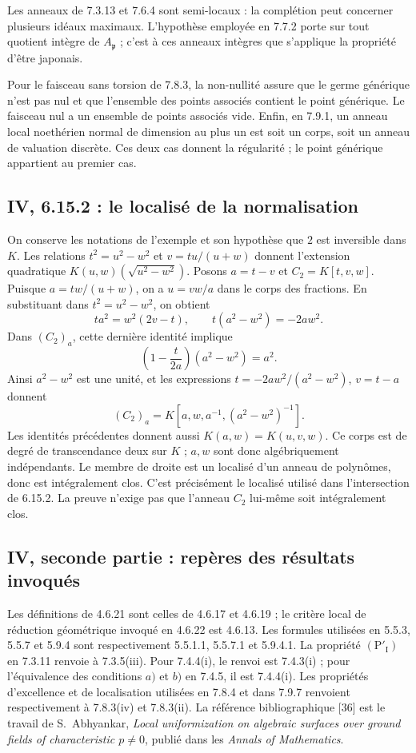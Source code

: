 \documentclass[11pt,a4paper]{article}
\begin{document}
Les anneaux de 7.3.13 et 7.6.4 sont semi-locaux : la complétion peut
concerner plusieurs idéaux maximaux. L'hypothèse employée en 7.7.2 porte
sur tout quotient intègre de $A_{\mathfrak p}$ ; c'est à ces anneaux
intègres que s'applique la propriété d'être japonais.

Pour le faisceau sans torsion de 7.8.3, la non-nullité assure que le
germe générique n'est pas nul et que l'ensemble des points associés
contient le point générique. Le faisceau nul a un ensemble de points
associés vide. Enfin, en 7.9.1, un anneau local noethérien normal de
dimension au plus un est soit un corps, soit un anneau de valuation
discrète. Ces deux cas donnent la régularité ; le point générique
appartient au premier cas.

\subsection{IV, 6.15.2 : le localisé de la normalisation}
\label{note:iv2-normalization}
On conserve les notations de l'exemple et son hypothèse que $2$ est
inversible dans $K$. Les relations $t^2=u^2-w^2$ et $v=tu/(u+w)$
donnent l'extension quadratique $K(u,w)(\sqrt{u^2-w^2})$.
Posons $a=t-v$ et $C_2=K[t,v,w]$. Puisque $a=tw/(u+w)$,
on a $u=vw/a$ dans le corps des fractions. En substituant dans
$t^2=u^2-w^2$, on obtient
\[
 t a^2=w^2(2v-t),\qquad t(a^2-w^2)=-2aw^2.
\]
Dans $(C_2)_a$, cette dernière identité implique
\[
 \left(1-\frac{t}{2a}\right)(a^2-w^2)=a^2.
\]
Ainsi $a^2-w^2$ est une unité, et les expressions
$t=-2aw^2/(a^2-w^2)$, $v=t-a$ donnent
\[
 (C_2)_a=K[a,w,a^{-1},(a^2-w^2)^{-1}].
\]
Les identités précédentes donnent aussi $K(a,w)=K(u,v,w)$.
Ce corps est de degré de transcendance deux sur $K$ ; $a,w$ sont donc
algébriquement indépendants. Le membre de droite est un localisé d'un
anneau de polynômes, donc est intégralement clos. C'est précisément le
localisé utilisé dans l'intersection de 6.15.2. La preuve n'exige pas
que l'anneau $C_2$ lui-même soit intégralement clos.

\subsection{IV, seconde partie : repères des résultats invoqués}
\label{note:iv2-refs}
Les définitions de 4.6.21 sont celles de 4.6.17 et 4.6.19 ; le critère
local de réduction géométrique invoqué en 4.6.22 est 4.6.13.
Les formules utilisées en 5.5.3, 5.5.7 et 5.9.4 sont respectivement
5.5.1.1, 5.5.7.1 et 5.9.4.1.
La propriété $(\mathrm P'_{\mathrm I})$ en 7.3.11 renvoie à 7.3.5(iii).
Pour 7.4.4(i), le renvoi est 7.4.3(i) ; pour l'équivalence des conditions
$a)$ et $b)$ en 7.4.5, il est 7.4.4(i).
Les propriétés d'excellence et de localisation utilisées en 7.8.4 et dans 7.9.7 renvoient respectivement à 7.8.3(iv) et 7.8.3(ii).
La référence bibliographique [36] est le travail de S.~Abhyankar,
\emph{Local uniformization on algebraic surfaces over ground fields of
characteristic $p\ne0$}, publié dans les \emph{Annals of Mathematics}.
\par
\end{document}
